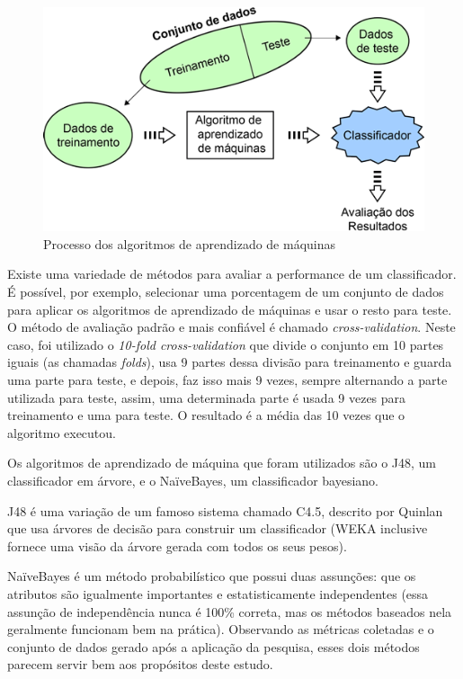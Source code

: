 \begin{figure}[h]
	\centering
	\includegraphics[scale=0.7]{figs/training-datasets-pequeno.png}
	\caption{\label{fig_1}Processo dos algoritmos de aprendizado de máquinas}
\end{figure}

Existe uma variedade de métodos para avaliar a performance de um classificador. É possível, por exemplo, selecionar uma porcentagem de um conjunto de dados para aplicar os algoritmos de aprendizado de máquinas e usar o resto para teste. O método de avaliação padrão e mais confiável é chamado \textit{cross-validation}. Neste caso, foi utilizado o \textit{10-fold cross-validation} que divide o conjunto em 10 partes iguais (as chamadas \textit{folds}), usa 9 partes dessa divisão para treinamento e guarda uma parte para teste, e depois, faz isso mais 9 vezes, sempre alternando a parte utilizada para teste, assim, uma determinada parte é usada 9 vezes para treinamento e uma para teste. O resultado é a média das 10 vezes que o algoritmo executou.

Os algoritmos de aprendizado de máquina que foram utilizados são o J48, um classificador em árvore, e o NaïveBayes, um classificador bayesiano.

J48 é uma variação de um famoso sistema chamado C4.5, descrito por Quinlan \cite{Quinlan1993} que usa árvores de decisão para construir um classificador (WEKA inclusive fornece uma visão da árvore gerada com todos os seus pesos).

NaïveBayes é um método probabilístico que possui duas assunções: que os atributos são igualmente importantes e estatisticamente independentes (essa assunção de independência nunca é 100\% correta, mas os métodos baseados nela geralmente funcionam bem na prática). Observando as métricas coletadas e o conjunto de dados gerado após a aplicação da pesquisa, esses dois métodos parecem servir bem aos propósitos deste estudo.

